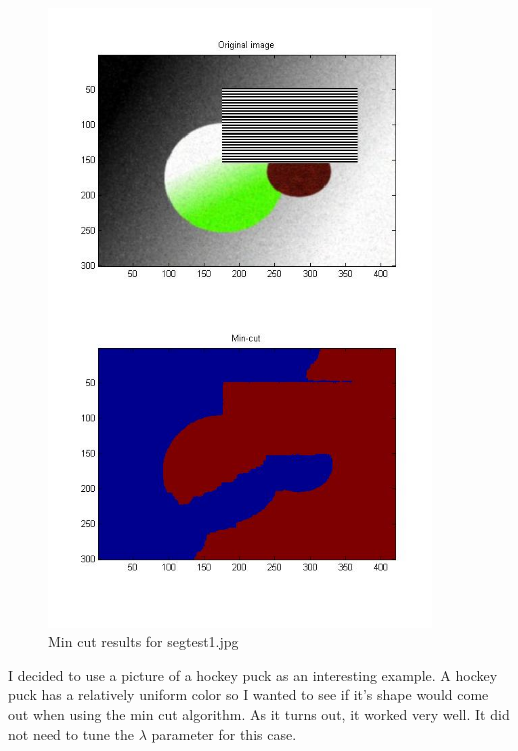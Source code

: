 \documentclass[11pt,psfig]{article}
\begin{document}
\begin{figure}[H]
\centering
\includegraphics[width=4in]{prob5plotA_2.jpg}
\caption{Min cut results for segtest1.jpg}
\end{figure}

I decided to use a picture of a hockey puck as an interesting example. A hockey puck has a relatively uniform color so I wanted to see if it's shape would come out when using the min cut algorithm. As it turns out, it worked very well. It did not need to tune the $\lambda$ parameter for this case. 
\end{document}
